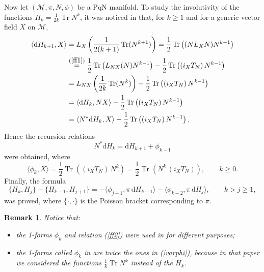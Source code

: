 \documentclass[12pt]{article}
\newtheorem{remark}[theorem]{Remark}
\newenvironment{rem}{\begin{remark} \rm}{\end{remark}}
\def\d{{\mathrm d}}
\def\parpo#1#2{\{#1,#2\}}
\newcommand{\brke}[2]{{{\langle #1,#2\rangle}}}
\def\M{{\mathcal M}}
\def\Tr{\operatorname{Tr}}
\begin{document}
Now let $(\M,\pi,N,\phi)$ be a PqN manifold. To study the involutivity of the functions $H_k=\frac1{2k}\Tr N^k$, it was noticed 
in \cite{FMOP2020} that, for $k\ge 1$ and for a generic vector field $X$ on $\M$, 
\begin{equation}
\label{req1}
\begin{split}
\brke{\d H_{k+1}}{X}&= L_X\left(\frac{1}{2(k+1)} \Tr(N^{k+1})\right)=\frac12\Tr\left((NL_X N)N^{k-1}\right)\\
&\buildrel(\ref{ff1})\over=\frac12\Tr\left(L_{NX}(N)N^{k-1}\right)-\frac12\Tr\left((i_XT_N)\, N^{k-1}\right)\\ 
&=L_{NX}\left(\frac1{2k} \Tr(N^{k})\right)-\frac12\Tr\left((i_XT_N)\, N^{k-1}\right)\\ 
&=\brke{\d H_{k}}{NX}-\frac12\Tr\left((i_XT_N)\, N^{k-1}\right)\\ 
&=\brke{N^*\d H_{k}}{X}-\frac12\Tr\left((i_XT_N)\, N^{k-1}\right).
\end{split}
\end{equation}
Hence the %
recursion %
relations %
\begin{equation}
\label{ff2}
N^* \d H_{k}=\d H_{k+1}+{\phi_{k-1}}
\end{equation}
were obtained, where %
\begin{equation}
\label{varphi}
\brke{\phi_k}{ X}= \frac12\Tr\left((i_XT_N)\, N^{k}\right)= \frac12\Tr\left(N^{k}\, (i_XT_N)\right),\qquad k\ge 0.
\end{equation}
Finally, the formula 
\begin{equation}
\label{recadd}
\parpo{H_k}{H_j}-\parpo{H_{k-1}}{H_{j+1}}=-\brke{ \phi_{j-1}}{\pi\, \d H_{k-1}}-\brke{\phi_{k-2}}{ \pi\, \d H_j},
\qquad k>j \ge 1,
\end{equation}
was proved, where $\{\cdot,\cdot\}$ is the Poisson bracket corresponding to $\pi$.
\begin{rem} 
Notice that:
\begin{itemize} 
\item the 1-forms $\phi_k$ and %
relation (\ref{ff2}) were used in \cite{Bogo96-180,Bogo96-182} for different purposes;
\item the 1-forms called $\phi_k$ in \cite{FMOP2020} are twice the ones in (\ref{varphi}), because in that paper we considered the functions 
$\frac1{k}\Tr N^k$ instead of the $H_k$.
\end{itemize}
\end{rem}
\end{document}
